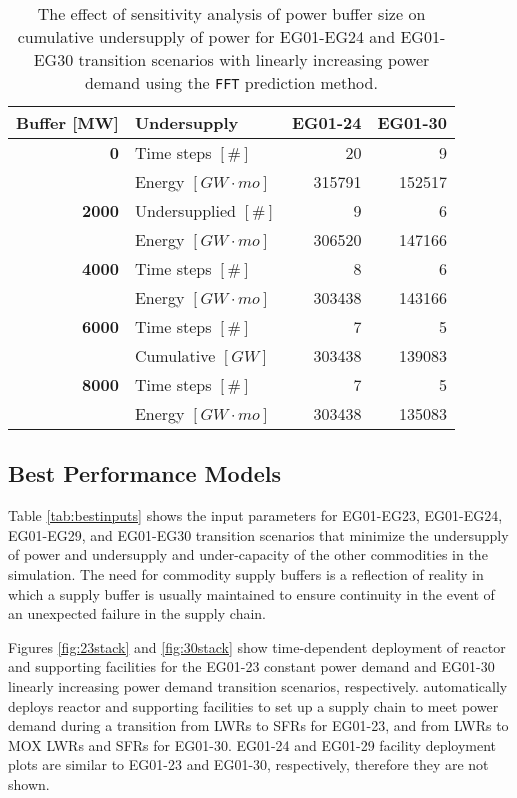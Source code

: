\begin{table}[]
	\centering
	\caption{The effect of sensitivity analysis of power buffer size on cumulative 
	undersupply of power for EG01-EG24 and EG01-EG30 transition scenarios with linearly 
	increasing power demand using the \texttt{FFT} prediction method.}
	\label{tab:buff_size}
	\footnotesize
		\begin{tabular}{r|lrr}
                \hline
        \textbf{Buffer [MW]}     & \textbf{Undersupply}             & \textbf{EG01-24}   & \textbf{EG01-30} \\
		\hline
		\textbf{0}             & Time steps $[\#]$ & 20 & 9\\  
                      & Energy $[GW\cdot mo]$    & 315791 & 152517 \\ \hline
		\textbf{2000}          & Undersupplied $[\#]$ & 9 & 6 \\  
        	      & Energy $[GW\cdot mo]$    & 306520 & 147166 \\ \hline
        \textbf{4000}          & Time steps $[\#]$ & 8 & 6 \\  
				  & Energy $[GW\cdot mo]$    & 303438 & 143166 \\ \hline
		\textbf{6000}          & Time steps $[\#]$ & 7 & 5 \\  
		& Cumulative $[GW]$    & 303438 & 139083 \\ \hline
        \textbf{8000}          & Time steps $[\#]$ & 7 & 5  \\  
	              & Energy $[GW\cdot mo]$    & 303438 & 135083 \\ \hline
	\end{tabular}
\end{table}

\subsection{Best Performance Models}
Table \ref{tab:bestinputs} shows the \deploy input parameters for
EG01-EG23, EG01-EG24, EG01-EG29, and EG01-EG30 transition scenarios
that minimize the undersupply of power and 
undersupply and under-capacity of the other commodities
in the simulation. 
The need for commodity supply buffers is a reflection of reality
in which a supply buffer is usually maintained to ensure 
continuity in the event of an unexpected failure in the supply chain.

Figures \ref{fig:23stack} and \ref{fig:30stack} show
time-dependent deployment of reactor and supporting facilities for 
the EG01-23 constant power demand and EG01-30 linearly increasing power demand 
transition scenarios, respectively. 
\deploy automatically deploys reactor and supporting facilities 
to set up a supply chain to meet power demand
during a transition from \glspl{LWR} to \glspl{SFR} for EG01-23, 
and from \glspl{LWR} to \gls{MOX} \glspl{LWR} and \glspl{SFR} for 
EG01-30. 
EG01-24 and EG01-29 facility deployment plots are similar to 
EG01-23 and EG01-30, respectively, therefore they are not shown. 

